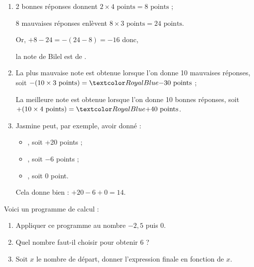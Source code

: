 \begin{Maquette}[Fiche,CorrigeFin,Colonnes=2]{}
\begin{multicols}{2}
      \begin{Solution}
         \begin{enumerate}
            \item 2 bonnes réponses donnent  $2\times4\text{ points} =8\text{ points}$ ; \par
               8 mauvaises réponses enlèvent $8\times3\text{ points} =24\text{ points}$. \par
               Or, $+8-24 =-(24-8) =-16$ donc, \par
               la note de Bilel est de .
            \item La plus mauvaise note est obtenue lorsque l'on donne 10 mauvaises réponses, soit $-(10\times3\text{ points}) =\cor{-30\text{ points}}$ ; \par
               La meilleure note est obtenue lorsque l'on donne 10 bonnes réponses, soit  $+(10\times4\text{ points}) =\cor{+40\text{ points}}$. \par
            \item Jasmine peut, par exemple, avoir donné :
               \begin{itemize}
                  \item {}, soit +20 points ;
                  \item {}, soit $-6$ points ; 
                  \item {}, soit 0 point.
               \end{itemize}
            Cela donne bien : $+20-6+0 =14$.
         \end{enumerate}
      \end{Solution}
      
      
      \begin{exercice} %
         Voici un programme de calcul :
         \begin{center}
         \end{center}
         \begin{enumerate}
            \item Appliquer ce programme au nombre $-2,5$ puis 0.
            \item Quel nombre faut-il choisir pour obtenir 6 ?
            \item Soit $x$ le nombre de départ, donner l'expression finale en fonction de $x$.
         \end{enumerate}
      \end{exercice}
      

\end{multicols}
\end{Maquette}
